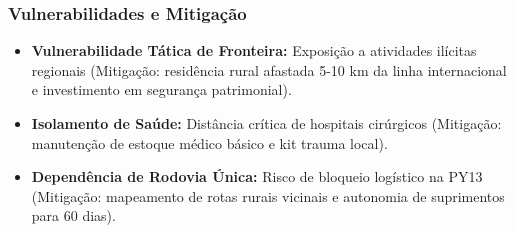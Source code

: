 \subsubsection{Vulnerabilidades e
Mitigação}

\begin{itemize}
\tightlist
\item
  \textbf{Vulnerabilidade Tática de Fronteira:} Exposição a atividades
  ilícitas regionais (Mitigação: residência rural afastada 5-10 km da
  linha internacional e investimento em segurança patrimonial).
\item
  \textbf{Isolamento de Saúde:} Distância crítica de hospitais
  cirúrgicos (Mitigação: manutenção de estoque médico básico e kit
  trauma local).
\item
  \textbf{Dependência de Rodovia Única:} Risco de bloqueio logístico na
  PY13 (Mitigação: mapeamento de rotas rurais vicinais e autonomia de
  suprimentos para 60 dias).
\end{itemize}

